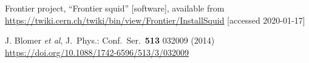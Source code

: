 \documentclass{webofc}
\begin{document}
\begin{thebibliography}{}
    Frontier project, ``Frontier squid'' [software], available from
    \url{https://twiki.cern.ch/twiki/bin/view/Frontier/InstallSquid}
    [accessed 2020-01-17] %

    J. Blomer \textit{et al},
    J.\ Phys.: Conf.\ Ser.\ \textbf{513} 032009 (2014)
    \url{https://doi.org/10.1088/1742-6596/513/3/032009} %

\end{thebibliography}
\end{document}
